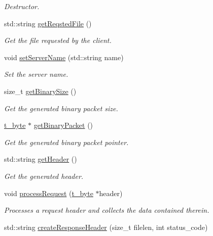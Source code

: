 \begin{DoxyCompactItemize}
\begin{DoxyCompactList}\small\item\em Destructor. \end{DoxyCompactList}\item 
std\+::string \hyperlink{classHttp_a362b9e0243157da63b2b5da257f3fc7e}{get\+Reqsted\+File} ()
\begin{DoxyCompactList}\small\item\em Get the file requested by the client. \end{DoxyCompactList}\item 
void \hyperlink{classHttp_ac5b12590b1659308b98893bf9df90e82}{set\+Server\+Name} (std\+::string name)
\begin{DoxyCompactList}\small\item\em Set the server name. \end{DoxyCompactList}\item 
size\+\_\+t \hyperlink{classHttp_a904c99cee10ce63a4430ea23589dbeef}{get\+Binary\+Size} ()
\begin{DoxyCompactList}\small\item\em Get the generated binary packet size. \end{DoxyCompactList}\item 
\hyperlink{util_8h_af1d862c52e0c84cc223f106956ac8543}{t\+\_\+byte} $\ast$ \hyperlink{classHttp_a45ee4558263fe5b0cbd8a7f52465b4e2}{get\+Binary\+Packet} ()
\begin{DoxyCompactList}\small\item\em Get the generated binary packet pointer. \end{DoxyCompactList}\item 
std\+::string \hyperlink{classHttp_abcbc6d6cd87c9386c50926eb6bd2ffdc}{get\+Header} ()
\begin{DoxyCompactList}\small\item\em Get the generated header. \end{DoxyCompactList}\item 
void \hyperlink{classHttp_af0c346ead006dfaaeef561326e8d5efe}{process\+Request} (\hyperlink{util_8h_af1d862c52e0c84cc223f106956ac8543}{t\+\_\+byte} $\ast$header)
\begin{DoxyCompactList}\small\item\em Processes a request header and collects the data contained therein. \end{DoxyCompactList}\item 
std\+::string \hyperlink{classHttp_a31f92b624ebfd1d047569738b171cc0d}{create\+Response\+Header} (size\+\_\+t filelen, int status\+\_\+code)

\end{DoxyCompactItemize}
